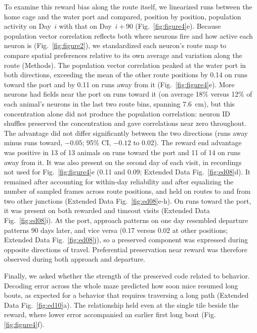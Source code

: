 \documentclass[fleqn,10pt]{wlscirep}
\begin{document}
To examine this reward bias along the route itself, we linearized runs between the home cage and the water port and compared, position by position, population activity on Day~$i$ with that on Day~$i+90$ (Fig.~\ref{fig:figure4}e). Because population vector correlation reflects both where neurons fire and how active each neuron is (Fig.~\ref{fig:figure2}), we standardized each neuron's route map to compare spatial preferences relative to its own average and variation along the route (Methods). The population vector correlation peaked at the water port in both directions, exceeding the mean of the other route positions by 0.14 on runs toward the port and by 0.11 on runs away from it (Fig.~\ref{fig:figure4}e). More neurons had fields near the port on runs toward it (on average 18\% versus 12\% of each animal's neurons in the last two route bins, spanning 7.6~cm), but this concentration alone did not produce the population correlation: neuron ID shuffles preserved the concentration and gave correlations near zero throughout. The advantage did not differ significantly between the two directions (runs away minus runs toward, $-0.05$; 95\% CI, $-0.12$ to 0.02). The reward end advantage was positive in 13 of 13 animals on runs toward the port and 11 of 14 on runs away from it. It was also present on the second day of each visit, in recordings not used for Fig.~\ref{fig:figure4}e (0.11 and 0.09; Extended Data Fig.~\ref{fig:ed08}d). It remained after accounting for within-day reliability and after equalizing the number of sampled frames across route positions, and held on routes to and from two other junctions (Extended Data Fig.~\ref{fig:ed08}e-h). On runs toward the port, it was present on both rewarded and timeout visits (Extended Data Fig.~\ref{fig:ed08}i). At the port, approach patterns on one day resembled departure patterns 90 days later, and vice versa (0.17 versus 0.02 at other positions; Extended Data Fig.~\ref{fig:ed08}j), so a preserved component was expressed during opposite directions of travel. Preferential preservation near reward was therefore observed during both approach and departure.

Finally, we asked whether the strength of the preserved code related to behavior. Decoding error across the whole maze predicted how soon mice resumed long bouts, as expected for a behavior that requires traversing a long path (Extended Data Fig.~\ref{fig:ed10}a). The relationship held even at the single tile beside the reward, where lower error accompanied an earlier first long bout (Fig. \ref{fig:figure4}f).
\end{document}
